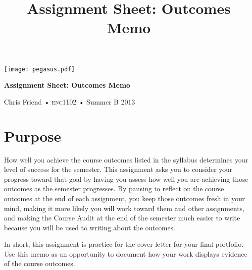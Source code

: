 \documentclass[10pt, oneside]{amsart}	%
\title[Outcomes Memo]{Assignment Sheet: Outcomes Memo}
\begin{document}
%
\thispagestyle{empty}

\begin{center}
\huge
{\texttt{[image: pegasus.pdf]}}

\textbf{Assignment Sheet: Outcomes Memo}

{\normalsize Chris Friend • \textsc{enc1102} • Summer B 2013}
\end{center}
\vspace{\baselineskip}

\section{Purpose} %
\label{sec:purpose}
How well you achieve the course outcomes listed in the syllabus determines your level of success for the semester. This assignment asks you to consider your progress toward that goal by having you assess how well you are achieving those outcomes as the semester progresses. By pausing to reflect on the course outcomes at the end of each assignment, you keep those outcomes fresh in your mind, making it more likely you will work toward them and other assignments, and making the Course Audit at the end of the semester much easier to write because you will be used to writing about the outcomes.

In short, this assignment is practice for the cover letter for your final portfolio. Use this memo as an opportunity to document how your work displays evidence of the course outcomes.
\end{document}
